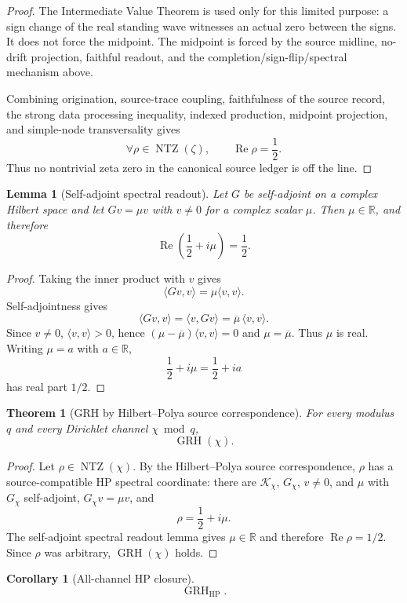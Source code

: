 \documentclass[11pt]{article}
\newtheorem{theorem}[definition]{Theorem}
\newtheorem{corollary}[definition]{Corollary}
\newtheorem{lemma}[definition]{Lemma}
\DeclareMathOperator{\Ree}{Re}
\DeclareMathOperator{\NTZ}{NTZ}
\DeclareMathOperator{\GRH}{GRH}
\begin{document}
\begin{proof}
The Intermediate Value Theorem is used only for this limited purpose: a sign
change of the real standing wave witnesses an actual zero between the signs. It
does not force the midpoint.  The midpoint is forced by the source midline,
no-drift projection, faithful readout, and the completion/sign-flip/spectral
mechanism above.

Combining origination, source-trace coupling, faithfulness of the source record,
the strong data processing inequality, indexed production, midpoint projection,
and simple-node transversality gives
\[
  \forall \rho\in\NTZ(\zeta),\qquad \Ree\rho=\frac12 .
\]
Thus no nontrivial zeta zero in the canonical source ledger is off the line.
\end{proof}

\begin{lemma}[Self-adjoint spectral readout]
Let $G$ be self-adjoint on a complex Hilbert space and let
$Gv=\mu v$ with $v\ne0$ for a complex scalar $\mu$.  Then $\mu\in\mathbb R$,
and therefore
\[
  \Ree\left(\frac12+i\mu\right)=\frac12 .
\]
\end{lemma}

\begin{proof}
Taking the inner product with $v$ gives
\[
  \langle Gv,v\rangle=\mu\langle v,v\rangle .
\]
Self-adjointness gives
\[
  \langle Gv,v\rangle=\langle v,Gv\rangle
  =
  \overline{\mu}\,\langle v,v\rangle .
\]
Since $v\ne0$, $\langle v,v\rangle>0$, hence
$(\mu-\overline{\mu})\langle v,v\rangle=0$ and $\mu=\overline{\mu}$.
Thus $\mu$ is real.  Writing $\mu=a$ with $a\in\mathbb R$,
\[
  \frac12+i\mu=\frac12+ia
\]
has real part $1/2$.
\end{proof}

\begin{theorem}[GRH by Hilbert--Polya source correspondence]
For every modulus $q$ and every Dirichlet channel $\chi\bmod q$,
\[
  \GRH(\chi).
\]
\end{theorem}

\begin{proof}
Let $\rho\in\NTZ(\chi)$.  By the Hilbert--Polya source correspondence, $\rho$
has a source-compatible HP spectral coordinate: there are
$\mathcal K_\chi$, $G_\chi$, $v\ne0$, and $\mu$ with $G_\chi$ self-adjoint,
$G_\chi v=\mu v$, and
\[
  \rho=\frac12+i\mu .
\]
The self-adjoint spectral readout lemma gives $\mu\in\mathbb R$ and therefore
$\Ree\rho=1/2$.  Since $\rho$ was arbitrary, $\GRH(\chi)$ holds.
\end{proof}

\begin{corollary}[All-channel HP closure]
\[
  \GRH_{\mathrm{HP}}.
\]
\end{corollary}
\end{document}

